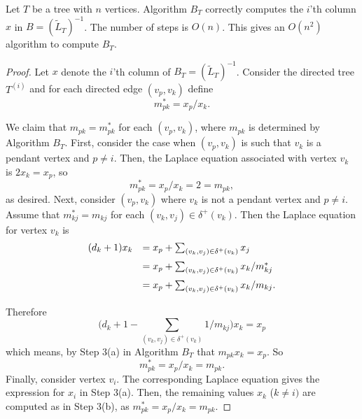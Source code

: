 \documentclass[10pt,a4paper]{amsart}
\begin{document}
\begin{theorem}
 \label{thm:tree_alg_BT}
  Let $T$ be a tree with $n$ vertices. Algorithm $B_T$ correctly computes the $i$'th column $x$ in $B=(\tilde{L}_T)^{-1}$.  The number of steps is $O(n)$. This gives an $O(n^2)$ algorithm to compute $B_T$.
  
\end{theorem}

\begin{proof}
Let $x$ denote the $i$'th column of $B_T=(\tilde{L}_T)^{-1}$. Consider the directed tree $T^{(i)}$ and for each directed edge $(v_p,v_k)$ define 
 \[
    m^*_{pk}=x_p/x_k.
 \]
 
 We claim that $m_{pk}=m^*_{pk}$ for each $(v_p,v_k)$, where $m_{pk}$ is determined by Algorithm $B_T$. First, consider the case when $(v_p,v_k)$ is such that $v_k$ is a pendant vertex and $p\not =i$. Then, the Laplace equation associated with vertex $v_k$ is 
 $2x_k=x_p$, so 
 \[
    m^*_{pk}=x_p/x_k=2=m_{pk},
 \]
 as desired. Next, consider $(v_p,v_k)$ where $v_k$ is not a pendant vertex and $p \not =i$. Assume that $m^*_{kj}=m_{kj}$ for each $(v_k,v_j) \in \delta^+(v_k)$. Then the Laplace equation for vertex $v_k$ is 
 \[
 \begin{array}{ll}\vspace{0.2cm}
    (d_k+1)x_k&=x_p+\sum_{(v_k,v_j) \in \delta^+(v_k)} x_j\\ \vspace{0.2cm}
     &=x_p+\sum_{(v_k,v_j) \in \delta^+(v_k)} x_k/m^*_{kj} \\ \vspace{0.2cm}
     &=x_p+\sum_{(v_k,v_j) \in \delta^+(v_k)} x_k/m_{kj}.
 \end{array}
 \]
 Therefore
 \[
  \big(d_k+1-\sum_{(v_k,v_j) \in \delta^+(v_k)} 1/m_{kj}\big)x_k=x_p 
 \]
 which means, by Step 3(a) in Algorithm $B_T$ that
 $m_{pk}x_k=x_p$. So 
 \[
    m^*_{pk}=x_p/x_k=m_{pk}.
 \]
 Finally, consider vertex $v_i$. The corresponding Laplace equation gives the expression for $x_i$ in Step 3(a). Then, the remaining values $x_k$ ($k \not = i)$ are computed as in Step 3(b), as $m^*_{pk}=x_p/x_k=m_{pk}$. 

 

\end{proof}
\end{document}
